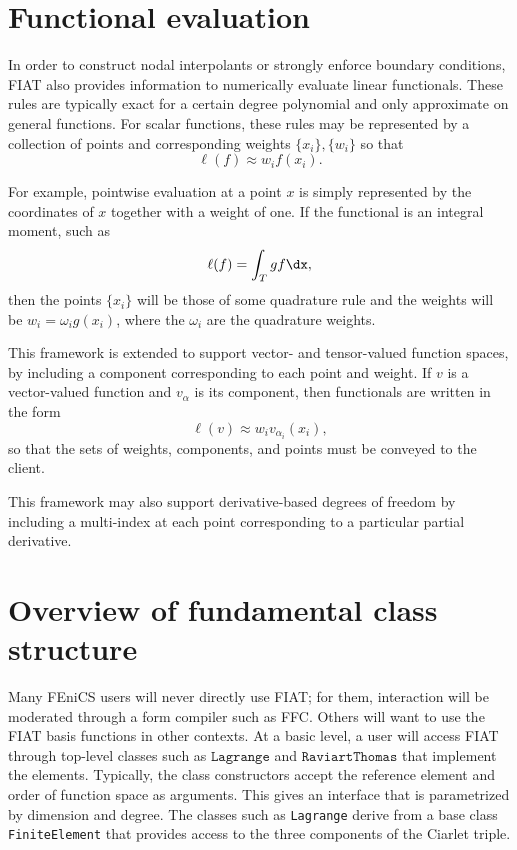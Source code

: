 \section{Functional evaluation}

In order to construct nodal interpolants or strongly enforce boundary
conditions, FIAT also provides information to numerically evaluate
linear functionals.  These rules are typically exact for a certain
degree polynomial and only approximate on general functions.  For scalar
functions, these rules may be represented by a collection of points and
corresponding weights $\{ x_i \} , \{ w_i \}$ so that
\begin{equation}
\ell( f ) \approx w_i f(x_i).
\end{equation}

For example, pointwise evaluation at a point \( x \) is simply represented
by the coordinates of \( x \) together with a weight of one. If the
functional is an integral moment, such as
\begin{equation}
\ell( f ) = \int_T g f \dx,
\end{equation}
then the points $\{ x_i \}$ will be those of some quadrature rule and
the weights will be $w_i = \omega_i g(x_i)$, where the $\omega_i$
are the quadrature weights.

This framework is extended to support vector- and tensor-valued function
spaces, by including a component corresponding to each point and weight.
If \( v \) is a vector-valued function and \( v_\alpha \) is its
component, then functionals are written in the form
\begin{equation}
\ell( v ) \approx w_i v_{\alpha_i}(x_i),
\end{equation}
so that the sets of weights, components, and points must be conveyed to
the client.

This framework may also support derivative-based degrees of freedom
by including a multi-index at each point corresponding to a particular
partial derivative.

\section{Overview of fundamental class structure}

Many FEniCS users will never directly use FIAT; for them, interaction
will be moderated through a form compiler such as FFC.
Others will want to use the FIAT basis functions in other contexts.
At a basic level, a user will access FIAT through top-level classes
such as \( \texttt{Lagrange} \) and \( \texttt{RaviartThomas} \) that
implement the elements.  Typically, the class constructors accept the
reference element and order of function space as arguments. This gives
an interface that is parametrized by dimension and degree. The classes
such as \texttt{Lagrange} derive from a base class \texttt{FiniteElement}
that provides access to the three components of the Ciarlet triple.

